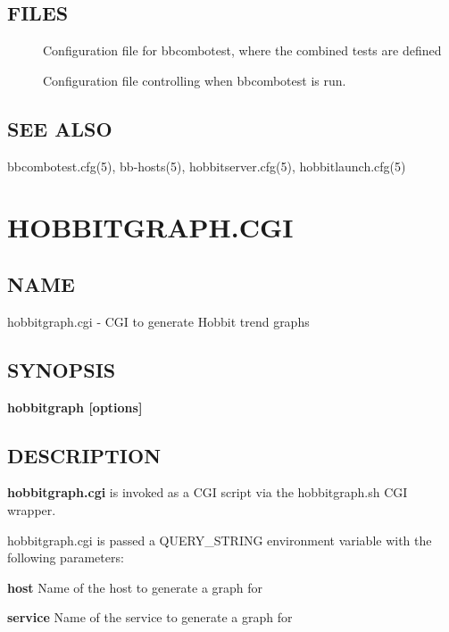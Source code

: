\subsection{FILES}
\begin{description}

\item[] Configuration file for
  bbcombotest, where the combined tests are defined 

\item[] Configuration file controlling
  when bbcombotest is run. 



\end{description}
\subsection{SEE ALSO}
bbcombotest.cfg(5), bb-hosts(5), hobbitserver.cfg(5), hobbitlaunch.cfg(5) 

%
\newpage
\section{HOBBITGRAPH.CGI}
\subsection{NAME}
 hobbitgraph.cgi - CGI to generate Hobbit trend graphs 
\subsection{SYNOPSIS}
\textbf{hobbitgraph [options]}


 
\subsection{DESCRIPTION}
\textbf{hobbitgraph.cgi}
 is invoked as a CGI script via the hobbitgraph.sh CGI wrapper. 

  hobbitgraph.cgi is passed a QUERY\_STRING environment variable with the following parameters: 


 \textbf{host}
 Name of the host to generate a graph for 


 \textbf{service}
 Name of the service to generate a graph for 


